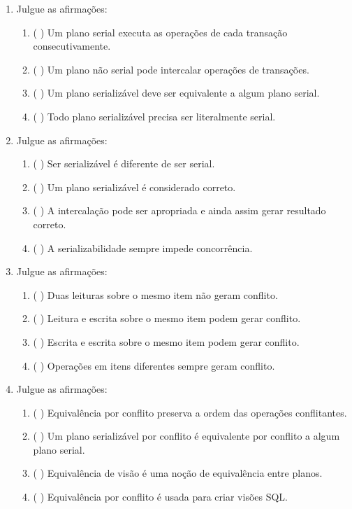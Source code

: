 \documentclass[12pt,a4paper]{article}
\begin{document}
\begin{enumerate}[resume,label=\textbf{Q\arabic*.}]
\item Julgue as afirmações:

\begin{enumerate}[label=\alph*)]
    \item ( \quad ) Um plano serial executa as operações de cada transação consecutivamente.
    \item ( \quad ) Um plano não serial pode intercalar operações de transações.
    \item ( \quad ) Um plano serializável deve ser equivalente a algum plano serial.
    \item ( \quad ) Todo plano serializável precisa ser literalmente serial.
\end{enumerate}

\item Julgue as afirmações:

\begin{enumerate}[label=\alph*)]
    \item ( \quad ) Ser serializável é diferente de ser serial.
    \item ( \quad ) Um plano serializável é considerado correto.
    \item ( \quad ) A intercalação pode ser apropriada e ainda assim gerar resultado correto.
    \item ( \quad ) A serializabilidade sempre impede concorrência.
\end{enumerate}

\item Julgue as afirmações:

\begin{enumerate}[label=\alph*)]
    \item ( \quad ) Duas leituras sobre o mesmo item não geram conflito.
    \item ( \quad ) Leitura e escrita sobre o mesmo item podem gerar conflito.
    \item ( \quad ) Escrita e escrita sobre o mesmo item podem gerar conflito.
    \item ( \quad ) Operações em itens diferentes sempre geram conflito.
\end{enumerate}

\item Julgue as afirmações:

\begin{enumerate}[label=\alph*)]
    \item ( \quad ) Equivalência por conflito preserva a ordem das operações conflitantes.
    \item ( \quad ) Um plano serializável por conflito é equivalente por conflito a algum plano serial.
    \item ( \quad ) Equivalência de visão é uma noção de equivalência entre planos.
    \item ( \quad ) Equivalência por conflito é usada para criar visões SQL.
\end{enumerate}


\end{enumerate}
\end{document}
